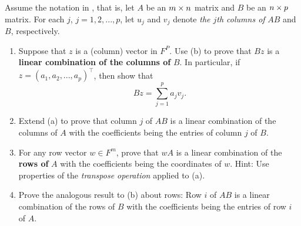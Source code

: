 \begin{exercise} \label{exercise 2.3.14}
Assume the notation in , that is,
let \(A\) be an \(m \times n\) matrix and \(B\) be an \(n \times p\) matrix.
For each \(j\), \(j = 1, 2, ..., p\), let \(u_j\) and \(v_j\) denote \emph{the \(j\)th columns of} \(AB\) and \(B\), respectively.
\begin{enumerate}
\item Suppose that \(z\) is a (column) vector in \(F^P\).
    Use (b) to prove that \(Bz\) is a \textbf{linear combination of the columns of} \(B\).
    In particular, if \(z = (a_1, a_2, ..., a_p)^\top\), then show that
    \[
        Bz = \sum_{j = 1}^p a_j v_j.
    \]

\item Extend (a) to prove that column \(j\) of \(AB\) is a linear combination of the columns of \(A\) with the coefficients being the entries of column \(j\) of \(B\).

\item For any row vector \(w \in F^m\), prove that \(wA\) is a linear combination of the \textbf{rows of} \(A\) with the coefficients being the coordinates of \(w\).
    Hint: Use properties of the \textit{transpose operation} applied to (a).
\item Prove the analogous result to (b) about rows:
    Row \(i\) of \(AB\) is a linear combination of the rows of \(B\) with the coefficients being the entries of row \(i\) of \(A\).
\end{enumerate}
\end{exercise}


